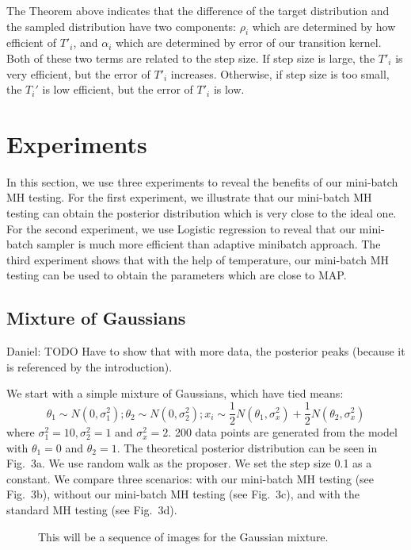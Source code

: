 \documentclass{article}
\begin{document}
The Theorem above indicates that the difference of the target distribution and the sampled distribution have two components: $\rho_i$ which are determined by how efficient of $T'_i$, and $\alpha_i$ which are determined by error of our transition kernel. Both of these two terms are related to the step size. If step size is large, the $T'_i$ is very efficient, but the error of $T'_i$ increases. Otherwise, if step size is too small, the $T_i'$ is low efficient, but the error of $T'_i$ is low.





\section{Experiments}\label{sec:experiments}

In this section, we use three experiments to reveal the benefits of our mini-batch MH testing. For
the first experiment, we illustrate that our mini-batch MH testing can obtain the posterior
distribution which is very close to the ideal one. For the second experiment, we use Logistic
regression to reveal that our mini-batch sampler is much more efficient than adaptive minibatch
approach. The third experiment shows that with the help of temperature, our mini-batch MH testing
can be used to obtain the parameters which are close to MAP. 

\subsection{Mixture of Gaussians}\label{ssec:gaussians}

{\color{blue}
Daniel: TODO Have to show that with more data, the posterior peaks (because it is referenced by the
introduction).
}

We start with a simple mixture of Gaussians, which have tied means:
\[
\theta_1 \sim N(0, \sigma_1^2); \theta_2 \sim N(0, \sigma_2^2); x_i \sim \frac{1}{2}N(\theta_1, \sigma_x^2) + \frac{1}{2} N(\theta_2, \sigma_x^2)
\]
where $\sigma_1^2 = 10, \sigma_2^2 = 1$ and $\sigma_x^2=2$. 200 data points are generated from the
model with $\theta_1 = 0$ and $\theta_2 = 1$. The theoretical posterior distribution can be seen in
Fig.~3a. We use random walk as the proposer. We set the step size 0.1 as a constant. We compare
three scenarios: with our mini-batch MH testing (see Fig.~3b), without our mini-batch MH testing
(see Fig.~3c), and with the standard MH testing (see Fig.~3d). 

\begin{figure}[ht]
  \centering
  \fbox{\rule[-.5cm]{0cm}{4cm} \rule[-.5cm]{4cm}{0cm}}
  \caption{This will be a sequence of images for the Gaussian mixture.}
\end{figure}
\end{document}
